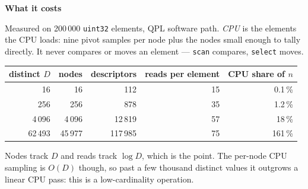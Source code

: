 \documentclass[11pt]{article}
\newcommand{\op}[1]{\texttt{#1}}
\begin{document}
\medskip

{\large\bfseries What it costs}

Measured on 200\,000 \op{uint32} elements, QPL software path. \emph{CPU} is the
elements the CPU loads: nine pivot samples per node plus the nodes small enough
to tally directly. It never compares or moves an element --- \op{scan} compares,
\op{select} moves.

\begin{center}
\begin{tabular}{r|rrrr}
  distinct $D$ & nodes & descriptors & reads per element & CPU share of $n$\\
  \hline
  16      &     16 &      112 &  15 & 0.1\,\%\\
  256     &    256 &      878 &  35 & 1.2\,\%\\
  4\,096  & 4\,096 & 12\,819 &  57 & 18\,\%\\
  62\,493 & 45\,977 & 117\,985 &  75 & 161\,\%\\
\end{tabular}
\end{center}

Nodes track $D$ and reads track $\log D$, which is the point. The per-node CPU
sampling is $O(D)$ though, so past a few thousand distinct values it outgrows a
linear CPU pass: this is a low-cardinality operation.
\end{document}
